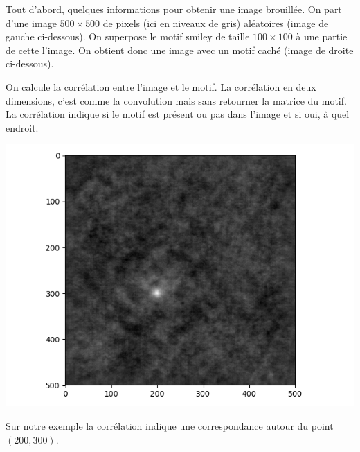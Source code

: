 \documentclass[11pt,class=report,crop=false]{standalone}
\begin{document}
Tout d'abord, quelques informations pour obtenir une image brouillée. On part d'une image $500\times 500$ de pixels (ici en niveaux de gris) aléatoires (image de gauche ci-dessous). On superpose le motif \og{}smiley\fg{} de taille $100 \times 100$ à une partie de cette l'image. On obtient donc une image avec un motif caché (image de droite ci-dessous).

% 
% 
%


\hspace*{-2em}
\begin{minipage}{\textwidth}
\end{minipage}



On calcule la corrélation entre l'image et le motif.
La corrélation en deux dimensions, c'est comme la convolution mais sans retourner la matrice du motif.
La corrélation indique si le motif est présent ou pas dans l'image et si oui, à quel endroit.

\begin{center}
\includegraphics[scale=\myscale,scale=0.45]{figures/correlation2d-4}
\end{center}
Sur notre exemple la corrélation indique une correspondance autour du point $(200,300)$.
\end{document}
